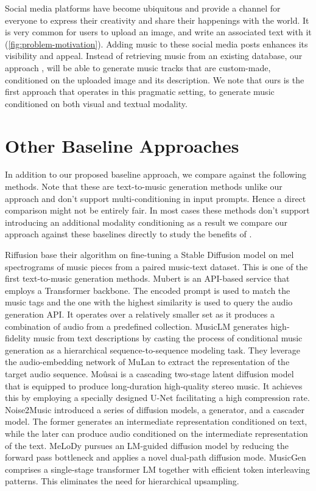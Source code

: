 Social media platforms have become ubiquitous and provide a channel for everyone to express their creativity and share their happenings with the world. It is very common for users to upload an image, and write an associated text with it (\cref{fig:problem-motivation}). Adding music to these social media posts enhances its visibility and appeal. Instead of retrieving music from an existing database, our approach \modelname, will be able to generate music tracks that are custom-made, conditioned on the uploaded image and its description. We note that ours is the first approach that operates in this pragmatic setting, to generate music conditioned on both visual and textual modality. 

\section{Other Baseline Approaches}
\label{sec: other baselines}
In addition to our proposed baseline approach, we compare \modelname against the following methods. Note that these are text-to-music generation methods unlike our approach and don't support multi-conditioning in input prompts. Hence a direct comparison might not be entirely fair. In most cases these methods don't support introducing an additional modality conditioning as a result we compare our approach against these baselines directly to study the benefits of \modelname.

Riffusion \cite{riffusion} base their algorithm on fine-tuning a Stable Diffusion model \cite{rombach2022high} on mel spectrograms of music pieces from a paired music-text dataset. This is one of the first text-to-music generation methods. Mubert \cite{mubert} is an API-based service that employs a Transformer backbone. The encoded prompt is used to match the music tags and the one with the highest similarity is used to query the audio generation API. It operates over a relatively smaller set as it produces a combination of audio from a predefined collection. MusicLM \cite{musiclm} generates high-fidelity music from text descriptions by casting the process of conditional music generation as a hierarchical sequence-to-sequence modeling task. They leverage the audio-embedding network of MuLan \cite{mulan} to extract the representation of the target audio sequence. Moûsai \cite{mousai} is a cascading two-stage latent diffusion model that is equipped to produce long-duration high-quality stereo music. It achieves this by employing a specially designed U-Net facilitating a high compression rate. Noise2Music \cite{noise2music} introduced a series of diffusion models, a generator, and a cascader model. The former generates an intermediate representation
conditioned on text, while the later can produce audio conditioned on the intermediate representation of the text. MeLoDy \cite{melody} pursues an LM-guided diffusion model by reducing the forward pass bottleneck and applies a novel dual-path diffusion mode. MusicGen \cite{musicgen} comprises a single-stage transformer LM together with efficient token interleaving patterns. This eliminates the need for hierarchical upsampling.

